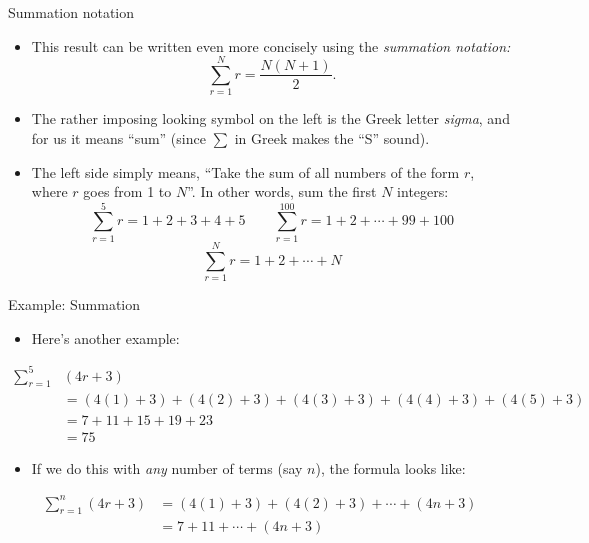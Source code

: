 \documentclass[11pt,aspectratio=1610,handout]{beamer}
\begin{document}
		\begin{frame}{Summation notation}
			\begin{itemize}
				\item This result can be written even more concisely using the \emph{summation notation:}
				\[
				\sum_{r=1}^N r = \frac{N(N+1)}{2}.
				\]
				\item The rather imposing looking symbol on the left is the Greek letter \emph{sigma}, and for us it means ``sum'' (since $\sum$ in Greek makes the ``S'' sound). 
				\item The left side simply means, ``Take the sum of all numbers of the form $r$, where $r$ goes from 1 to $N$''. In other words, sum the first $N$ integers: 
				\[
				\sum_{r=1}^5 r = 1 + 2 + 3 + 4 + 5 \quad\quad
				\sum_{r=1}^{100} r= 1 + 2 + \cdots + 99 + 100
				\]
				\[
				\sum_{r=1}^N r= 1 + 2 + \cdots + N
				\]
			\end{itemize}
		\end{frame}
		
		\begin{frame}{Example: Summation}
			\begin{itemize}
				\item Here's another example: 
			\end{itemize}
			\vspace{-0.1in}
			\begin{align*}
			\sum_{r=1}^5 &(4r+3) \\
			&= (4(1) + 3) + (4(2)+3) + (4(3) + 3) + (4(4) + 3) + (4(5) + 3) \\
			&= 7 + 11 + 15 + 19 + 23 \\
			&= 75
			\end{align*}
			\vspace{-0.2in}
			\begin{itemize}
				\item If we do this with \emph{any} number of terms (say $n$), the formula looks like: 
			\end{itemize}
			\vspace{-0.1in}
			\begin{align*}
			\sum_{r=1}^n (4r + 3) &= (4(1) + 3) + (4(2) + 3) + \cdots + (4n + 3) \\
			&= 7 + 11 + \cdots + (4n+3)
			\end{align*}
		\end{frame}
		
\end{document}
